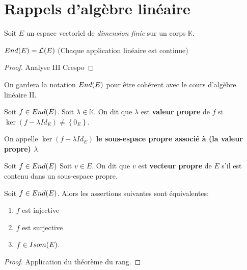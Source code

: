 \section{Rappels d'algèbre linéaire}

Soit $E$ un espace vectoriel de \textit{dimension finie} sur un corps
$\mathbb{K}$.

\begin{proposition}
	$End(E) = \mathcal{L}(E)$
	(Chaque application linéaire est continue)
\end{proposition}

\begin{proof}
	Analyse III Crespo
\end{proof}


On gardera la notation $End(E)$ pour être cohérent avec le cours
d'algèbre linéaire II.

\begin{definition}
	\label{def:alg_lin_valeur_propre}
	Soit $f \in End(E)$.
	Soit $\lambda \in \mathbb{K}$.
	On dit que $\lambda$ est \textbf{valeur propre} de $f$ si $\ker(f - \lambda
		Id_{E}) \neq \left\{ 0_{E} \right\}$.
	
	On appelle $\ker(f - \lambda Id_{E})$ \textbf{le sous-espace propre associé
	à (la valeur propre) $\lambda$}
\end{definition}

\begin{definition}
	\label{def:alg_lin_vecteur_propre}
	Soit $f \in End(E)$
	Soit $v \in E$.
	On dit que $v$ est \textbf{vecteur propre} de $E$ s'il est contenu dans un
	sous-espace propre.
\end{definition}

\begin{proposition}
	Soit $f \in End(E)$.
	Alors les assertions suivantes sont équivalentes:

	\begin{enumerate}
		\item $f$ est injective
		\item $f$ est surjective
		\item $f \in Isom(E)$.
	\end{enumerate}
\end{proposition}

\begin{proof}
	Application du théorème du rang.
\end{proof}
